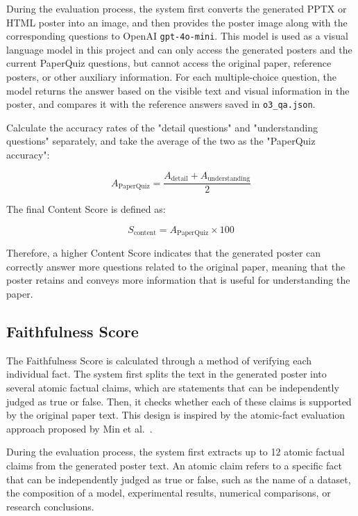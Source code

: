 \documentclass[12pt,oneside]{report}
\begin{document}
\vspace{1em}

During the evaluation process, the system first converts the generated PPTX or HTML poster into an image, and then provides the poster image along with the corresponding questions to OpenAI \texttt{gpt-4o-mini}. This model is used as a visual language model in this project and can only access the generated posters and the current PaperQuiz questions, but cannot access the original paper, reference posters, or other auxiliary information. For each multiple-choice question, the model returns the answer based on the visible text and visual information in the poster, and compares it with the reference answers saved in \texttt{o3\_qa.json}.

\vspace{1em}

Calculate the accuracy rates of the "detail questions" and "understanding questions" separately, and take the average of the two as the "PaperQuiz accuracy":

\[
A_{\mathrm{PaperQuiz}}
=
\frac{
A_{\mathrm{detail}}
+
A_{\mathrm{understanding}}
}{2}
\]

The final Content Score is defined as:

\[
S_{\mathrm{content}}
=
A_{\mathrm{PaperQuiz}}
\times 100
\]

Therefore, a higher Content Score indicates that the generated poster can correctly answer more questions related to the original paper, meaning that the poster retains and conveys more information that is useful for understanding the paper.

\subsection{Faithfulness Score}

The Faithfulness Score is calculated through a method of verifying each individual fact. The system first splits the text in the generated poster into several atomic factual claims, which are statements that can be independently judged as true or false. Then, it checks whether each of these claims is supported by the original paper text. This design is inspired by the atomic-fact evaluation approach proposed by Min et al.~\cite{factscore}.

\vspace{1em}

During the evaluation process, the system first extracts up to 12 atomic factual claims from the generated poster text. An atomic claim refers to a specific fact that can be independently judged as true or false, such as the name of a dataset, the composition of a model, experimental results, numerical comparisons, or research conclusions.
\end{document}
